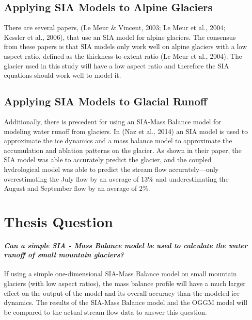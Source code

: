 \documentclass{article}
\begin{document}
\subsection{Applying SIA Models to Alpine Glaciers}
    There are several papers, (Le Meur \& Vincent, 2003; Le Meur et al., 2004; Kessler et al., 2006), that use an SIA model for alpine glaciers. The consensus 
from these papers is that SIA models only work well on alpine glaciers with a low aspect ratio, defined as the thickness-to-extent ratio 
(Le Meur et al., 2004). The glacier used in this study will have a low aspect ratio and therefore the SIA equations should work well to model it.
\subsection{Applying SIA Models to Glacial Runoff}
    Additionally, there is precedent for using an SIA-Mass Balance model for modeling water runoff from glaciers. In (Naz et al., 2014) an 
SIA model is used to approximate the ice dynamics and a mass balance model to approximate the accumulation and ablation patterns on the glacier. 
As shown in their paper, the SIA model was able to accurately predict the glacier, and the coupled hydrological model was able to predict 
the stream flow accurately---only overestimating the July flow by an average of 13\% and underestimating the August and September flow by an 
average of 2\%.

\section{Thesis Question}
\paragraph{}
\noindent\textit{\textbf{Can a simple SIA - Mass Balance model be used to calculate the water runoff of small mountain glaciers?}}
\paragraph{}
If using a simple one-dimensional SIA-Mass Balance model on small mountain glaciers (with low aspect ratios), the mass balance profile will have a 
much larger effect on the output of the model and its overall accuracy than the modeled ice dynamics. The results of the SIA-Mass Balance 
model and the OGGM model will be compared to the actual stream flow data to answer this question.
\end{document}
